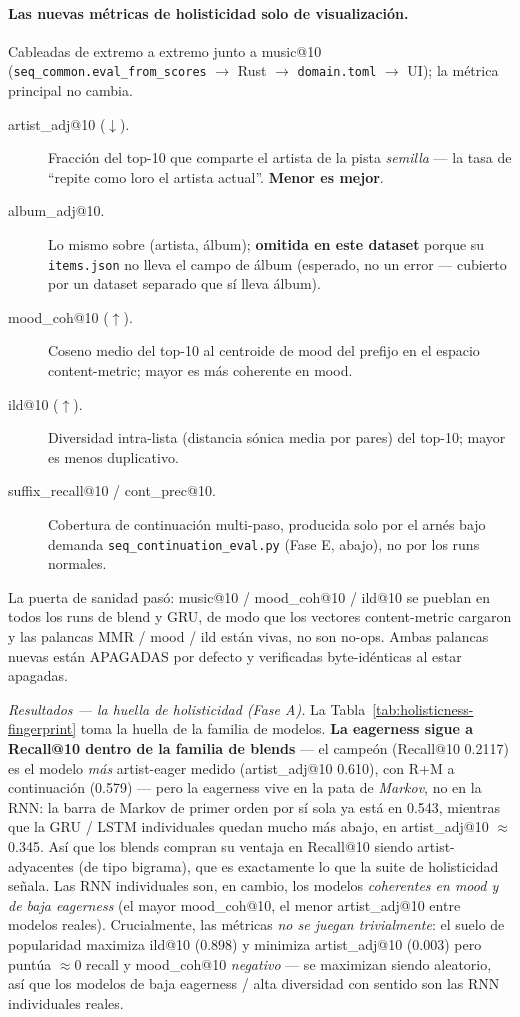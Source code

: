 \documentclass[11pt]{article}
\begin{document}
\paragraph{Las nuevas métricas de holisticidad solo de visualización.} Cableadas de
extremo a extremo junto a music@10 (\texttt{seq\_common.eval\_from\_scores} $\to$ Rust
$\to$ \texttt{domain.toml} $\to$ UI); la métrica principal no cambia.
\begin{description}
  \item[artist\_adj@10 ($\downarrow$).] Fracción del top-10 que comparte el artista de
  la pista \emph{semilla} --- la tasa de ``repite como loro el artista actual''.
  \textbf{Menor es mejor}.
  \item[album\_adj@10.] Lo mismo sobre (artista, álbum); \textbf{omitida en este
  dataset} porque su \texttt{items.json} no lleva el campo de álbum (esperado, no un
  error --- cubierto por un dataset separado que sí lleva álbum).
  \item[mood\_coh@10 ($\uparrow$).] Coseno medio del top-10 al centroide de mood del
  prefijo en el espacio content-metric; mayor es más coherente en mood.
  \item[ild@10 ($\uparrow$).] Diversidad intra-lista (distancia sónica media por pares)
  del top-10; mayor es menos duplicativo.
  \item[suffix\_recall@10 / cont\_prec@10.] Cobertura de continuación multi-paso,
  producida solo por el arnés bajo demanda \texttt{seq\_continuation\_eval.py}
  (Fase E, abajo), no por los runs normales.
\end{description}
La puerta de sanidad pasó: music@10 / mood\_coh@10 / ild@10 se pueblan en todos los
runs de blend y GRU, de modo que los vectores content-metric cargaron y las palancas
MMR / mood / ild están vivas, no son no-ops. Ambas palancas nuevas están APAGADAS por
defecto y verificadas byte-idénticas al estar apagadas.

\emph{Resultados --- la huella de holisticidad (Fase A).} La Tabla~\ref{tab:holisticness-fingerprint}
toma la huella de la familia de modelos. \textbf{La eagerness sigue a Recall@10 dentro
de la familia de blends} --- el campeón (Recall@10 \num{0.2117}) es el modelo \emph{más}
artist-eager medido (artist\_adj@10 \num{0.610}), con R+M a continuación (\num{0.579})
--- pero la eagerness vive en la pata de \emph{Markov}, no en la RNN: la barra de Markov
de primer orden por sí sola ya está en \num{0.543}, mientras que la GRU / LSTM
individuales quedan mucho más abajo, en artist\_adj@10 $\approx$ \num{0.345}. Así que
los blends compran su ventaja en Recall@10 siendo artist-adyacentes (de tipo bigrama),
que es exactamente lo que la suite de holisticidad señala. Las RNN individuales son, en
cambio, los modelos \emph{coherentes en mood y de baja eagerness} (el mayor
mood\_coh@10, el menor artist\_adj@10 entre modelos reales). Crucialmente, las métricas
\emph{no se juegan trivialmente}: el suelo de popularidad maximiza ild@10 (\num{0.898})
y minimiza artist\_adj@10 (\num{0.003}) pero puntúa $\approx 0$ recall y mood\_coh@10
\emph{negativo} --- se maximizan siendo aleatorio, así que los modelos de baja eagerness
/ alta diversidad con sentido son las RNN individuales reales.
\end{document}
